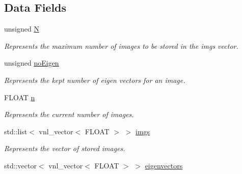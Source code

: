 \subsection*{Data Fields}
\begin{DoxyCompactItemize}
\item 
\hypertarget{classBackground_a8cc2e7240164328fdc3f0e5e21032c56}{
unsigned \hyperlink{classBackground_a8cc2e7240164328fdc3f0e5e21032c56}{N}}
\label{classBackground_a8cc2e7240164328fdc3f0e5e21032c56}

\begin{DoxyCompactList}\small\item\em Represents the maximum number of images to be stored in the {\ttfamily imgs} vector. \item\end{DoxyCompactList}\item 
\hypertarget{classBackground_af6be8e29dfd74ef1409ead7fab675e32}{
unsigned \hyperlink{classBackground_af6be8e29dfd74ef1409ead7fab675e32}{noEigen}}
\label{classBackground_af6be8e29dfd74ef1409ead7fab675e32}

\begin{DoxyCompactList}\small\item\em Represents the kept number of {\ttfamily eigen} {\ttfamily vectors} for an image. \item\end{DoxyCompactList}\item 
\hypertarget{classBackground_aeab71244afb687f16d8c4f5ee9d6ef0e}{
FLOAT \hyperlink{classBackground_aeab71244afb687f16d8c4f5ee9d6ef0e}{n}}
\label{classBackground_aeab71244afb687f16d8c4f5ee9d6ef0e}

\begin{DoxyCompactList}\small\item\em Represents the current number of images. \item\end{DoxyCompactList}\item 
\hypertarget{classBackground_a7f417fb9a54a478886c049912c2b74ef}{
std::list$<$ vnl\_\-vector$<$ FLOAT $>$ $>$ \hyperlink{classBackground_a7f417fb9a54a478886c049912c2b74ef}{imgs}}
\label{classBackground_a7f417fb9a54a478886c049912c2b74ef}

\begin{DoxyCompactList}\small\item\em Represents the vector of stored images. \item\end{DoxyCompactList}\item 
\hypertarget{classBackground_a4b377022ff3181c71dbf4bad6a4836b3}{
std::vector$<$ vnl\_\-vector$<$ FLOAT $>$ $>$ \hyperlink{classBackground_a4b377022ff3181c71dbf4bad6a4836b3}{eigenvectors}}
\label{classBackground_a4b377022ff3181c71dbf4bad6a4836b3}


\end{DoxyCompactItemize}

